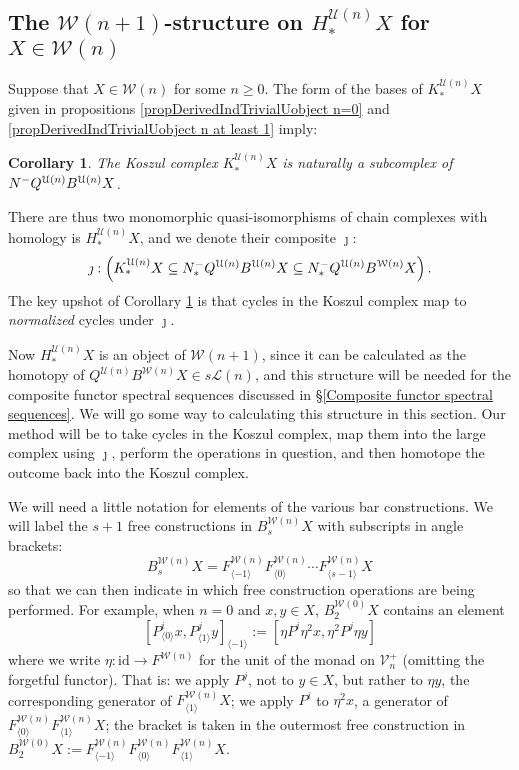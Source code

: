 \documentclass[11pt]{amsart} \renewcommand{\baselinestretch}{1.2}
\theoremstyle{plain}
\newtheorem{cor}[thm]{Corollary}
\theoremstyle{definition}
\renewcommand{\to}{\longrightarrow}
\newcommand{\calU}{\mathcal{U}}
\newcommand{\calL}{\mathcal{L}}
\newcommand{\calV}{\mathcal{V}}
\newcommand{\calw}{\mathcal{W}}
\newcommand{\vect}[2]{\calV^{#1}_{#2}}
\newcommand{\Nop}{N^{\smash{-}}}
\newcommand{\Id}{\mathrm{id}}
\begin{document}
\begin{Koszul complexes}
\subsection{The $\calw(n+1)$-structure on $H_*^{\calU(n)}X$ for $X\in\calw(n)$}\label{section on structure on homology of koszul cx}
Suppose that $X\in\calw(n)$ for some $n\geq0$. The form of the bases of $K_*^{\calU(n)}X$ given in propositions \ref{propDerivedIndTrivialUobject n=0} and \ref{propDerivedIndTrivialUobject n at least 1} imply:
\begin{cor}
\label{cycles in the Koszul complex are normalized cycles}
The Koszul complex $K_*^{\calU(n)}X$ is naturally a subcomplex of $\Nop Q^{\calU(n)}B^{\calU(n)}X$.
\end{cor}
\noindent  There are  thus two monomorphic quasi-isomorphisms of chain complexes with homology is $H_*^{\calU(n)}X$, and we denote their composite $\jmath$:
\[\jmath:\left(K_*^{\calU(n)}X\subseteq \Nop_*Q^{\calU(n)}B^{\calU(n)}X\subseteq \Nop_*Q^{\calU(n)}B^{\calw(n)}X\right).\]
The key upshot of Corollary \ref{cycles in the Koszul complex are normalized cycles} is that cycles in the Koszul complex map to \emph{normalized} cycles under $\jmath$.

Now $H^{\calU(n)}_*X$ is an object of $\calw(n+1)$, since it can be calculated as the homotopy of $Q^{\calU(n)}B^{\calw(n)}X\in s\calL(n)$, and this  structure will be needed for the composite functor spectral sequences discussed in \S\ref{Composite functor spectral sequences}. We will go some way to calculating this structure in this section. Our method will be to take cycles in the Koszul complex, map them into the large complex using $\jmath$, perform the operations in question, and then homotope the outcome back into the Koszul complex.

We will need a little notation for elements of the various bar constructions. We will label the $s+1$ free constructions in $B^{\calw(n)}_{s}X$ with subscripts in angle brackets: 
\[B^{\calw(n)}_{s}X= F^{\calw(n)}_{\langle -1\rangle}F^{\calw(n)}_{\langle 0\rangle}\cdots F^{\calw(n)}_{\langle s-1\rangle}X\]%
so that we can then indicate in which free construction operations are being performed. For example, when $n=0$ and $x,y\in X$, $B_2^{\calw(0)}X$ contains an element
\[[P^i_{\langle 0\rangle}x,P^j_{\langle 1\rangle}y]_{\langle -1\rangle}:=[\eta P^i\eta^2 x,\eta^2P^j\eta y]\]%
where we write $\eta:\Id\to F^{\calw(n)}$ for the unit of the monad on $\vect{+}{n}$ (omitting the forgetful functor). That is: we apply $P^j$, not to $y\in X$, but rather to $\eta y$, the corresponding generator of $F^{\calw(n)}_{\langle 1\rangle}X$; we  apply $P^i$ to $\eta^2 x$, a generator of $F^{\calw(n)}_{\langle 0\rangle}F^{\calw(n)}_{\langle 1\rangle}X$; the bracket is taken in the outermost free construction in $B_2^{\calw(0)}X:=F^{\calw(n)}_{\langle -1\rangle}F^{\calw(n)}_{\langle 0\rangle}F^{\calw(n)}_{\langle 1\rangle}X$.%


\end{Koszul complexes}
\end{document}
